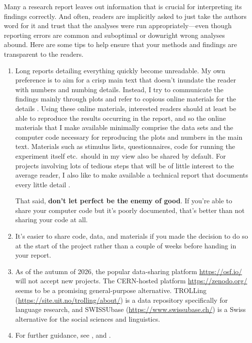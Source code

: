 \documentclass[a4paper]{tufte-book}\usepackage[]{graphicx}\usepackage[]{xcolor}
\begin{document}
Many a research report leaves out information that is crucial
for interpreting its findings correctly. And often, readers are
implicitly asked to just take the authors word for it and trust that the
analyses were run appropriately---even though reporting errors are common
\citep{Nuijten2016} and suboptimal or downright wrong analyses
abound.
Here are some tips to help ensure that your methods and
findings are transparent to the readers.

\begin{enumerate}
  \item Long reports detailing everything quickly become unreadable.
        My own preference
        is to aim for a crisp main text that doesn't inundate the reader
        with numbers and numbing details. Instead, I try to communicate the findings
        mainly through plots and refer to copious online
        materials for the details \citep[also contains further guidance for writing quantitative research reports and some useful references]{Vanhove2020b}. 
        Using these online materials, interested readers should 
        at least be able to reproduce the results occurring in the 
        report, and so the online materials that I make available minimally
        comprise the data sets and the computer code necessary for reproducing
        the plots and numbers in the main text.
        Materials such as stimulus lists, questionnaires, code for running
        the experiment itself etc.\ should in my view also be shared by default.
        For projects involving lots of tedious steps that will be of little
        interest to the average reader, I also like to make available a technical
        report that documents every little detail \citep[e.g.,][]{Vanhove2019}.
        
        That said, \textbf{don't let perfect be the enemy of good}. If you're able to 
        share your computer code but it's poorly documented, that's better than
        not sharing your code at all.
        
  \item It's easier to share code, data, and materials if you made the decision
        to do so at the start of the project rather than a couple of weeks before
        handing in your report.
        
  \item As of the autumn of 2026, the popular data-sharing platform
        \url{https://osf.io/} will not accept new projects.
        The CERN-hosted platform \url{https://zenodo.org/} seems to be
        a promising general-purpose alternative.
        TROLLing (\url{https://site.uit.no/trolling/about/}) is a data 
        repository specifically for language research,
        and SWISSUbase (\url{https://www.swissubase.ch/}) is a Swiss
        alternative for the social sciences and linguistics.
        
  \item For further guidance, 
        see \citet{Klein2018},
        and \citet{Levenstein2018}.
\end{enumerate}


\backmatter



\end{document}
